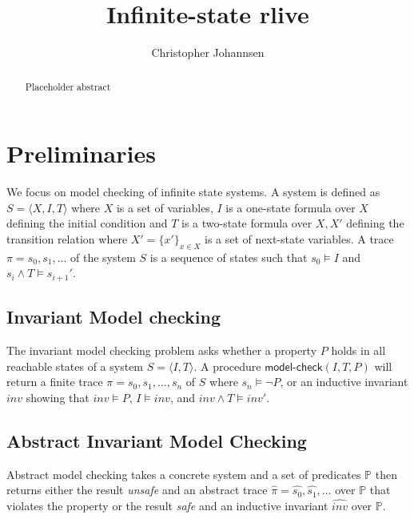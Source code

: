 \documentclass[runningheads]{llncs}
\newcommand{\mc}{\textsf{model-check}}
\newcommand{\abs}[1]{\ensuremath{\widehat{#1}}}
\newcommand{\preds}{\ensuremath{\mathbb{P}}}
\begin{document}
\title{Infinite-state rlive}

\author{Christopher Johannsen}

\maketitle             

\begin{abstract}
\noindent Placeholder abstract       
\end{abstract}

\section{Preliminaries}

We focus on model checking of infinite state systems. A system is defined as $S = \langle X,I,T
\rangle$ where $X$ is a set of variables, $I$ is a one-state formula over $X$ defining the initial
condition and $T$ is a two-state formula over $X,X'$ defining the transition relation where $X' =
\{x'\}_{x \in X}$ is a set of next-state variables. A trace $\pi = s_0,s_1,\dots$ of the system $S$
is a sequence of states such that $s_0 \models I$ and $s_i \land T \models s_{i+1}'$. 

\subsection{Invariant Model checking}

The invariant model checking problem asks whether a property $P$ holds in all reachable states of a
system $S = \langle I,T \rangle$. A procedure $\mc(I,T,P)$ will return a finite trace $\pi =
s_0,s_1,\dots,s_n$ of $S$ where $s_n \models \neg P$, or an inductive invariant $inv$ showing that
$inv \models P$, $I \models inv$, and $inv \land T \models inv'$.

\subsection{Abstract Invariant Model Checking}

Abstract model checking takes a concrete system and a set of predicates \preds{} then returns either
the result \emph{unsafe} and an abstract trace $\abs{\pi} = \abs{s_0},\abs{s_1},\dots$ over \preds{}
that violates the property or the result \emph{safe} and an inductive invariant $\abs{inv}$ over
\preds.
\end{document}

